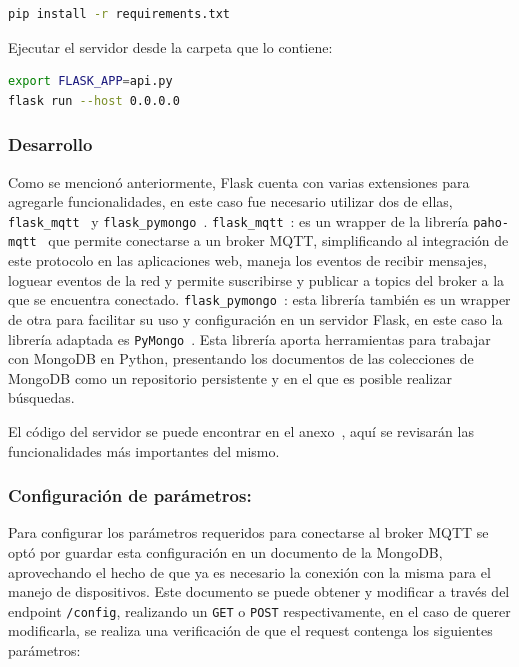 \begin{lstlisting}[language=bash]
pip install -r requirements.txt
\end{lstlisting}

Ejecutar el servidor desde la carpeta que lo contiene:

\begin{lstlisting}[language=bash]
export FLASK_APP=api.py
flask run --host 0.0.0.0
\end{lstlisting}

\subsubsection{Desarrollo}
Como se mencionó anteriormente, Flask cuenta con varias extensiones para agregarle funcionalidades, en este caso fue necesario utilizar dos de ellas, \lstinline[columns=fixed]{flask_mqtt}~\cite{flask-mqtt} y \lstinline[columns=fixed]{flask_pymongo}~\cite{flask-pymongo}.
\lstinline[columns=fixed]{flask_mqtt}~\cite{flask-mqtt}: es un wrapper de la librería \lstinline[columns=fixed]{paho-mqtt}~\cite{paho-mqtt} que permite conectarse a un broker MQTT, simplificando al integración de este protocolo en las aplicaciones web, maneja los eventos de recibir mensajes, loguear eventos de la red y permite suscribirse y publicar a topics del broker a la que se encuentra conectado. 
\lstinline[columns=fixed]{flask_pymongo}~\cite{flask-pymongo}: esta librería también es un wrapper de otra para facilitar su uso y configuración en un servidor Flask, en este caso la librería adaptada es \lstinline[columns=fixed]{PyMongo}~\cite{PyMongo}. Esta librería aporta herramientas para trabajar con MongoDB en Python, presentando los documentos de las colecciones de MongoDB como un repositorio persistente y en el que es posible realizar búsquedas.

El código del servidor se puede encontrar en el anexo~, aquí se revisarán las funcionalidades más importantes del mismo.

\subsubsection{Configuración de parámetros:}
Para configurar los parámetros requeridos para conectarse al broker MQTT se optó por guardar esta configuración en un documento de la MongoDB, aprovechando el hecho de que ya es necesario la conexión con la misma para el manejo de dispositivos.
Este documento se puede obtener y modificar a través del endpoint \lstinline[columns=fixed]{/config}, realizando un \lstinline[columns=fixed]{GET} o \lstinline[columns=fixed]{POST} respectivamente, en el caso de querer modificarla, se realiza una verificación de que el request contenga los siguientes parámetros:


